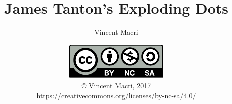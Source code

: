

\usepackage{mathtools}




\frenchspacing

\title{James Tanton's Exploding Dots}
\author{Vincent Macri}
\date{\includegraphics{by-nc-sa}\\\copyright{} Vincent Macri, 2017\\\footnotesize\url{https://creativecommons.org/licenses/by-nc-sa/4.0/}}


\newenvironment{whatif}%
	{\begin{namedframe}{What if\ldots}\Huge What if\ldots\normalsize

	}
	{\end{namedframe}}

\newcommand{\bigframe}[1]{\begin{namedframe}{#1}\Huge\centering#1\end{namedframe}}


	\frame{\titlepage}
	
	
	
	
	
	
	


